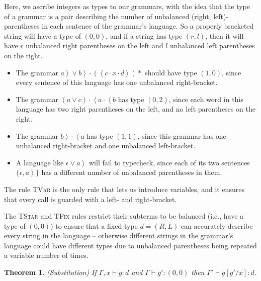\documentclass{article}
\newcommand{\lft}[1]{\left<{#1}\right.}
\newcommand{\rgt}[1]{\left.{#1}\right>}
\newcommand{\judgebalance}[3][\Gamma]{{#1} \vdash {#2} : {#3}}
\newcommand{\zero}{(0,0)}
\newcommand{\setof}[1]{\{{#1}\}}
\newtheorem{theorem}{Theorem}
\begin{document}
Here, we ascribe integers as types to our grammars, with the idea that
the type of a grammar is a pair describing the number of unbalanced
(right, left)-parentheses in each sentence of the grammar's language.
So a properly bracketed string will have a type of $\zero$, and if a
string has type $(r, l)$, then it will have $r$ unbalanced right
parentheses on the left and $l$ unbalanced left parentheses on the
right.


\begin{itemize}
\item The grammar $\rgt{a} \vee \rgt{b}\cdot(\lft{c}\cdot x\cdot
  \rgt{d})*$ should have type $(1, 0)$, since every sentence of this
  language has one unbalanced right-bracket.

\item The grammar $(a \vee c)\cdot\lft{a}\cdot\lft{b}$ has type $(0, 2)$, since 
  each word in this language has two right parentheses on the left, and 
  no left parentheses on the right. 

\item The grammar $\rgt{b}\cdot\lft{a}$ has type $(1, 1)$, since this
  grammar has one unbalanced right-bracket and one unbalanced left-bracket. 

\item A language like $\epsilon \vee \rgt{a}$ will fail to typecheck,
  since each of its two sentences $\setof{\epsilon, \rgt{a}}$ has a
  different number of unbalanced parentheses in them. 
\end{itemize}

The rule \textsc{TVar} is the only rule that lets us introduce 
variables, and it ensures that every call is guarded with a left-
and right-bracket.  

The \textsc{TStar} and \textsc{TFix} rules restrict their subterms to
be balanced (i.e., have a type of $\zero$) to ensure that a fixed type
$d = (R, L)$ can accurately describe every string in the language --
otherwise different strings in the grammar's language could have
different types due to unbalanced parentheses being repeated a variable
number of times.




\begin{theorem}{(Substitution)}
If $\judgebalance[\Gamma,x]{g}{d}$ and $\judgebalance{g'}{\zero}$
then $\judgebalance[\Gamma']{g[g'/x]}{d}$. 
\end{theorem}
\end{document}
